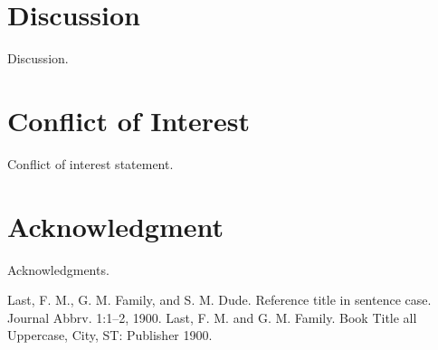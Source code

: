 \documentclass[12pt]{article}
\begin{document}
\section{Discussion} 
\label{sec:discussion}
Discussion.

\section*{Conflict of Interest} 
Conflict of interest statement.
 
\section*{Acknowledgment}
Acknowledgments.


%

\begin{thebibliography}{10}
    Last, F. M., G. M. Family, and S. M. Dude.
    \newblock
    Reference title in sentence case.
    \newblock
    Journal Abbrv. 1:1--2, 1900.
    Last, F. M. and G. M. Family.
    \newblock
    Book Title all Uppercase,
    City, ST: Publisher 1900.
\end{thebibliography}
\end{document}
